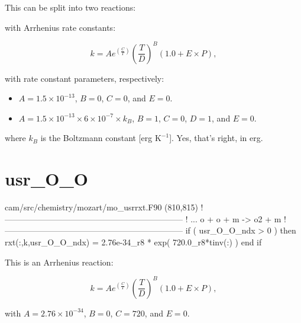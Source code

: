 \documentclass[titlepage]{article}
\begin{document}
This can be split into two reactions:
\vspace{20px}



\vspace{20px}

\noindent with Arrhenius rate constants:

\begin{equation}
k = Ae^{(\frac{C}{T})}(\frac{T}{D})^B(1.0+E \times P),
\end{equation}

\noindent with rate constant parameters, respectively:

\begin{itemize}
\item $A = 1.5 \times 10^{-13}$, $B = 0$, $C = 0$, and $E = 0$.
\item $A = 1.5 \times 10^{-13} \times 6 \times 10^{-7} \times k_B$, $B = 1$, $C = 0$, $D = 1$, and $E = 0$.
\end{itemize}

\noindent where $k_B$ is the Boltzmann constant [erg $\mbox{K}^{-1}$]. Yes, that's right, in erg.



\section{usr\_O\_O}

\begin{blockcode}[commandchars=\\\{\}]
\color{gray}cam/src/chemistry/mozart/mo_usrrxt.F90 (810,815)
!-----------------------------------------------------------------
! ... o + o + m -> o2 + m
!-----------------------------------------------------------------
       if ( usr_O_O_ndx > 0 ) then
          rxt(:,k,usr_O_O_ndx) = 2.76e-34_r8 * exp( 720.0_r8*tinv(:) )
       end if
\end{blockcode}

This is an Arrhenius reaction:

\begin{equation}
k = Ae^{(\frac{C}{T})}(\frac{T}{D})^B(1.0+E \times P),
\end{equation}

\noindent with $A = 2.76 \times 10^{-34}$, $B = 0$, $C = 720$, and $E = 0$.
 
 
          
\end{document}
